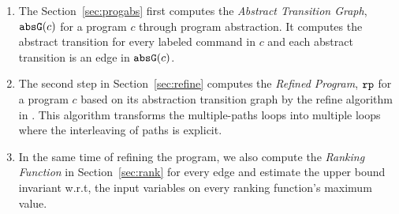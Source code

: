 \begin{enumerate}
\item  The Section~\ref{sec:progabs} first 
computes the \emph{Abstract Transition Graph}, $\mathtt{abs}{\mathtt{G}}(c)$ for a program $c$ through program abstraction.
It computes the abstract transition 
for every labeled command in $c$ and each abstract transition is an edge in $\mathtt{abs}{\mathtt{G}}(c)$.
\item The second step in Section~\ref{sec:refine}
computes the \emph{Refined Program}, $\mathtt{rp}$ for a program $c$ based on 
its abstraction transition graph by the refine algorithm in \cite{GulwaniJK09}.
This algorithm transforms the multiple-paths loops
into multiple loops where
the interleaving of paths is explicit.
\item In the same time of refining the program, we also compute the \emph{Ranking Function} in Section~\ref{sec:rank}
for every edge 
and estimate the upper bound invariant w.r.t, the input variables on every ranking function's maximum value.


\end{enumerate}
